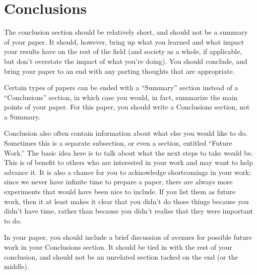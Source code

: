 \documentclass[12pt, letterpaper]{article}
\begin{document}
\section{Conclusions}
The conclusion section should be relatively short, and should not be a summary
of your paper.  It should, however, bring up what you learned and what impact
your results have on the rest of the field (and society as a whole, if
applicable, but don't overstate the impact of what you're doing).  You should
conclude, and bring your paper to an end with any parting thoughts that are
appropriate.

Certain types of papers can be ended with a ``Summary'' section instead of a
``Conclusions'' section, in which case you would, in fact, summarize the main
points of your paper.  For this paper, you should write a Conclusions section,
not a Summary.

Conclusion also often contain information about what else you would like
to do.  Sometimes this is a separate subsection, or even a section, entitled
``Future Work.''  The basic idea here is to talk about what the next steps to
take would be.  This is of benefit to others who are interested in your
work and may want to help advance it.  It is also a chance for you to
acknowledge shortcomings in your work; since we never have infinite time to
prepare a paper, there are always more experiments that would have been nice to
include.  If you list them as future work, then it at least makes it clear that
you didn't do those things because you didn't have time, rather than because you
didn't realise that they were important to do.

In your paper, you should include a brief discussion of avenues for possible
future work in your Conclusions section.  It should be tied in with the rest of
your conclusion, and should not be an unrelated section tacked on the end (or
the middle).





\end{document}

